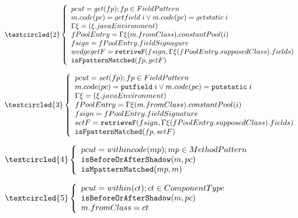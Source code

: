 $\textcircled{2}\left\{\begin{array}{l}
pcut=get(fp);fp\in FieldPattern\\
m.code(pc)=getfield\;i\vee m.code(pc)=getstatic\;i\\
\Gamma\xi=(\xi .javaEnvironment)\\
fPoolEntry=\Gamma\xi(m.fromClass).constantPool(i)\\
fsign=fPoolEntry.fieldSignagure\\
wedge getF=\texttt{retriveF}(fsign,\Gamma\xi(fPoolEntry.supposedClass).fields)\\
\texttt{isFpatternMatched}(fp,getF)\\
\end{array}\right.$

$\textcircled{3}\left\{\begin{array}{l}
pcut=set(fp);fp\in FieldPattern\\
m.code(pc)=\texttt{putfield}\;i\vee m.code(pc)=\texttt{putstatic}\;i\\
\Gamma\xi=(\xi .javaEnvironment)\\
fPoolEntry=\Gamma\xi(m.fromClass).constantPool(i)\\
fsign=fPoolEntry.fieldSignature\\
setF=\texttt{retrieveF}(fsign,\Gamma\xi(fPoolEntry.supposedClass).fields)\\
\texttt{isFpatternMatched}(fp,setF)\\
\end{array}\right.$

$\textcircled{4}\left\{\begin{array}{l}
pcut=withincode(mp);mp\in MethodPattern\\
\texttt{isBeforeOrAfterShadow}(m,pc)\\
\texttt{isMpatternMatched}(mp,m)\\
\end{array}\right.$

$\textcircled{5}\left\{\begin{array}{l}
pcut=within(ct);ct\in ComponentType\\
\texttt{isBeforeOrAfterShadow}(m,pc)\\
m.fromClass=ct\\
\end{array}\right.$

